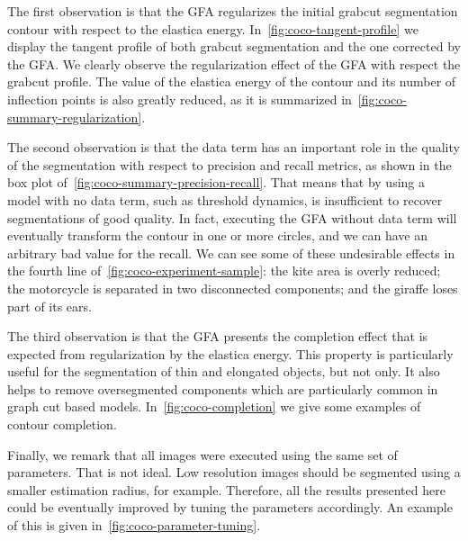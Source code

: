 \documentclass[review]{siamart220329}
\begin{document}
%
%
The first observation is that the GFA regularizes the initial grabcut segmentation contour with respect to the elastica energy. In~\cref{fig:coco-tangent-profile} we display the tangent profile of both grabcut segmentation and the one corrected by the GFA. We clearly observe the regularization effect of the GFA with respect the grabcut profile. The value of the elastica energy of the contour and its number of inflection points is also greatly reduced, as it is summarized in~\cref{fig:coco-summary-regularization}.

The second observation is that the data term has an important role in the quality of the segmentation with respect to precision and recall metrics, as shown in the box plot of~\cref{fig:coco-summary-precision-recall}. That means that by using a model with no data term, such as threshold dynamics, is insufficient to recover segmentations of good quality. In fact, executing the GFA without data term will eventually transform the contour in one or more circles, and we can have an arbitrary bad value for the recall. We can see some of these undesirable effects in the fourth line of~\cref{fig:coco-experiment-sample}: the kite area is overly reduced; the motorcycle is separated in two disconnected components; and the giraffe loses part of its ears.

The third observation is that the GFA presents the completion effect that is expected from regularization by the elastica energy. This property is particularly useful for the segmentation of thin and elongated objects, but not only. It also helps to remove oversegmented components which are particularly common in graph cut based models. In~\cref{fig:coco-completion} we give some examples of contour completion.

Finally, we remark that all images were executed using the same set of parameters. That is not ideal. Low resolution images should be segmented using a smaller estimation radius, for example. Therefore, all the results presented here could be eventually improved by tuning the parameters accordingly. An example of this is given in~\cref{fig:coco-parameter-tuning}.
\end{document}
